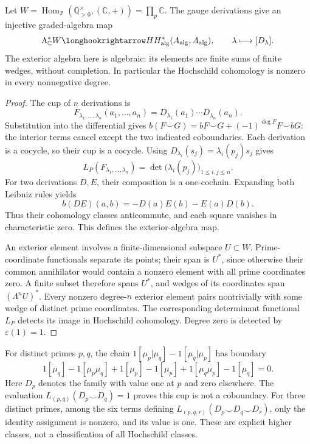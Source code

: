 \begin{theorem}
\label{v4-arith:bc:exterior-injection}
Let \(W=\operatorname{Hom}_{\mathbb Z}
 (\mathbb Q_{>0}^{\times},(\mathbb C,+))=\prod_p\mathbb C\).
The gauge derivations give an injective graded-algebra map
\[
 \Lambda_{\mathbb C}^*W\longhookrightarrow
 HH^*_{\mathrm{alg}}(A_{\mathrm{alg}},A_{\mathrm{alg}}),
 \qquad \lambda\longmapsto[D_\lambda].
\]
The exterior algebra here is algebraic: its elements are finite
sums of finite wedges, without completion. In particular the
Hochschild cohomology is nonzero in every nonnegative degree.
\end{theorem}
\begin{proof}
The cup of \(n\) derivations is
\[
 F_{\lambda_1,\ldots,\lambda_n}(a_1,\ldots,a_n)
   =D_{\lambda_1}(a_1)\cdots D_{\lambda_n}(a_n).
\]
Substitution into the differential gives
\(b(F\smile G)=bF\smile G+(-1)^{\deg F}F\smile bG\): the
interior terms cancel except the two indicated coboundaries.
Each derivation is a cocycle, so their cup is a cocycle.
Using \(D_{\lambda_i}(s_j)=\lambda_i(p_j)s_j\) gives
\[
 L_P(F_{\lambda_1,\ldots,\lambda_n})
       =\det\bigl(\lambda_i(p_j)\bigr)_{1\le i,j\le n}.
\]
For two derivations \(D,E\), their composition is a one-cochain.
Expanding both Leibniz rules yields
\[
 b(DE)(a,b)=-D(a)E(b)-E(a)D(b).
\]
Thus their cohomology classes anticommute, and each square vanishes
in characteristic zero. This defines the exterior-algebra map.

An exterior element involves a finite-dimensional subspace
\(U\subset W\). Prime-coordinate functionals separate its points;
their span is \(U^*\), since otherwise their common annihilator
would contain a nonzero element with all prime coordinates zero.
A finite subset therefore spans \(U^*\), and wedges of its
coordinates span \((\Lambda^nU)^*\). Every nonzero degree-\(n\)
exterior element pairs nontrivially with some wedge of distinct
prime coordinates. The corresponding determinant functional \(L_P\)
detects its image in Hochschild cohomology. Degree zero is detected
by \(\varepsilon(1)=1\).
\end{proof}

\begin{example}
For distinct primes \(p,q\), the chain
\(1[\mu_p|\mu_q]-1[\mu_q|\mu_p]\) has boundary
\[
 1[\mu_q]-1[\mu_p\mu_q]+1[\mu_p]
 -1[\mu_p]+1[\mu_q\mu_p]-1[\mu_q]=0.
\]
Here \(D_p\) denotes the family with value one at \(p\) and zero
elsewhere. The evaluation
\(L_{(p,q)}(D_p\smile D_q)=1\) proves this cup is not a coboundary.
For three distinct primes, among the six terms defining
\(L_{(p,q,r)}(D_p\smile D_q\smile D_r)\), only the identity
assignment is nonzero, and its value is one. These are explicit
higher classes, not a classification of all Hochschild classes.
\end{example}

